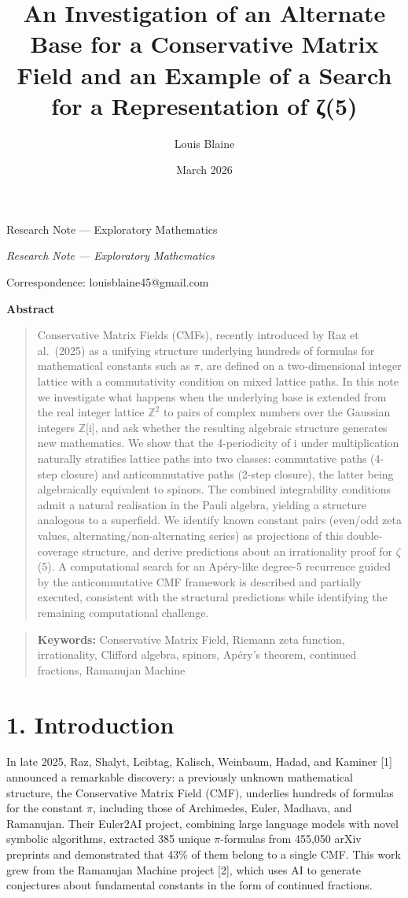 \documentclass[11pt]{article}
\makeatletter
\renewcommand\maketitle{%
  \begingroup
  \begin{center}
    \LARGE\bfseries \@title \par
  \end{center}
  \ifx\@subtitle\@empty\else
    \vspace{0.4em}
    \begin{center}
      \itshape \@subtitle \par
    \end{center}
  \fi
  \vspace{0.6em}
  \begin{center}
    \@author \par
    \vspace{0.2em}
    Correspondence: \@correspondence \par
    \vspace{0.2em}
    \@date \par
  \end{center}
  \vspace{1em}
  \endgroup
}
\def\@subtitle{}
\newcommand{\subtitleX}[1]{\def\@subtitle{#1}}
\def\@correspondence{}
\newcommand{\correspondenceX}[1]{\def\@correspondence{#1}}
\renewenvironment{abstract}{%
  \begin{center}\bfseries Abstract\end{center}%
  \begin{quote}\setlength{\parindent}{0pt}}{\end{quote}\medskip}
\newcommand{\keywordsX}[1]{%
  \begin{quote}\setlength{\parindent}{0pt}\textbf{Keywords:} #1\end{quote}}
\makeatother
\begin{document}
\title{An Investigation of an Alternate Base for a Conservative Matrix
Field and an Example of a Search for a Representation of ζ(5)}
\subtitleX{Research Note --- Exploratory Mathematics}
\author{Louis Blaine}
\correspondenceX{louisblaine45@gmail.com}
\date{March 2026}

\maketitle

\begin{abstract}
Conservative Matrix Fields (CMFs), recently introduced by Raz et
al.~(2025) as a unifying structure underlying hundreds of formulas for
mathematical constants such as \(\pi\), are defined on a two-dimensional
integer lattice with a commutativity condition on mixed lattice paths.
In this note we investigate what happens when the underlying base is
extended from the real integer lattice \(\mathbb{Z}^{2}\) to pairs of
complex numbers over the Gaussian integers \(\mathbb{Z}\){[}i{]}, and
ask whether the resulting algebraic structure generates new mathematics.
We show that the 4-periodicity of i under multiplication naturally
stratifies lattice paths into two classes: commutative paths (4-step
closure) and anticommutative paths (2-step closure), the latter being
algebraically equivalent to spinors. The combined integrability
conditions admit a natural realisation in the Pauli algebra, yielding a
structure analogous to a superfield. We identify known constant pairs
(even/odd zeta values, alternating/non-alternating series) as
projections of this double-coverage structure, and derive predictions
about an irrationality proof for \(\zeta\)(5). A computational search
for an Apéry-like degree-5 recurrence guided by the anticommutative CMF
framework is described and partially executed, consistent with the
structural predictions while identifying the remaining computational
challenge.
\end{abstract}

\keywordsX{Conservative Matrix Field, Riemann zeta function,
irrationality, Clifford algebra, spinors, Apéry's theorem, continued
fractions, Ramanujan Machine}

\hypertarget{introduction}{%
\section{1. Introduction}\label{introduction}}

In late 2025, Raz, Shalyt, Leibtag, Kalisch, Weinbaum, Hadad, and
Kaminer {[}1{]} announced a remarkable discovery: a previously unknown
mathematical structure, the Conservative Matrix Field (CMF), underlies
hundreds of formulas for the constant \(\pi\), including those of
Archimedes, Euler, Madhava, and Ramanujan. Their Euler2AI project,
combining large language models with novel symbolic algorithms,
extracted 385 unique \(\pi\)-formulas from 455,050 arXiv preprints and
demonstrated that 43\% of them belong to a single CMF. This work grew
from the Ramanujan Machine project {[}2{]}, which uses AI to generate
conjectures about fundamental constants in the form of continued
fractions.
\end{document}
